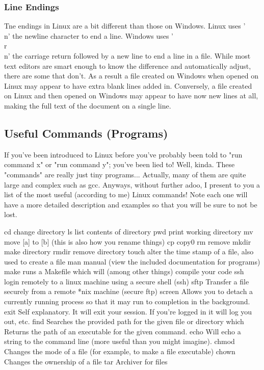 \subsubsection{Line Endings} \mdseries
Tne endings in Linux are a bit different than those on Windows.  Linux uses '\\n' the newline character to end a line.  Windows uses '\\r\\n' the carriage return followed by a new line to end a line in a file.  While most text editors are smart enough to know the difference and automatically adjust, there are some that don't.  As a result a file created on Windows when opened on Linux may appear to have extra blank lines added in.  Conversely, a file created on Linux and then opened on Windows may appear to have now new lines at all, making the full text of the document on a single line.


\subsection{Useful Commands (Programs)} \mdseries
If you've been introduced to Linux before you've probably been told to "run command x" or "run command y"; you've been lied to!  Well, kinda.  These "commands" are really just tiny programs... Actually, many of them are quite large and complex such as gcc.  Anyways, without further adoo, I present to you a list of the most useful (according to me) Linux commands!  Note each one will have a more detailed description and examples so that you will be sure to not be lost.

	cd		change directory
	ls		list contents of directory
	pwd		print working directory
	mv		move [a] to [b] (this is also how you rename things)
	cp		copy0
	rm		remove
	mkdir	make directory
	rmdir	remove directory
	touch	alter the time stamp of a file, also used to create a file
	man		manual (view the included documentation for programs)
	make	runs a Makefile which will (among other things) compile your code
	ssh		login remotely to a linux machine using a secure shell (ssh)
	sftp	Transfer a file securely from a remote *nix machine (secure ftp)
	screen	Allows you to detach a currently running process so that it may run to completion in the background.
	exit	Self explanatory.  It will exit your session.  If you're logged in it will log you out, etc.
	find	Searches the provided path for the given file or directory
	which	Returns the path of an executable for the given command.  
	echo	Will echo a string to the command line (more useful than you might imagine).
	chmod	Changes the mode of a file (for example, to make a file executable)
	chown	Changes the ownership of a file
	tar		Archiver for files
		
